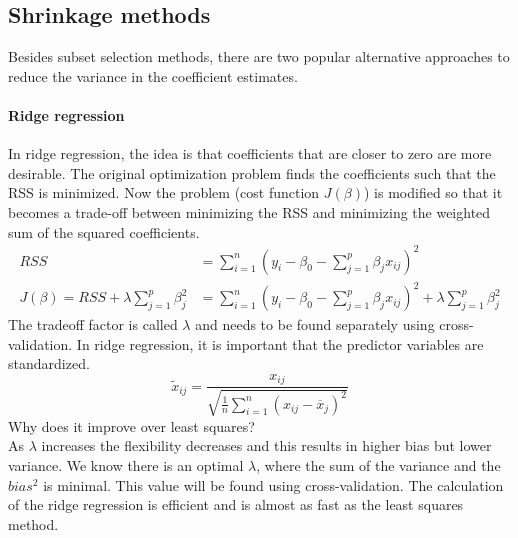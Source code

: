 \documentclass[../document.tex]{subfiles}
\begin{document}
	\subsection{Shrinkage methods}
	Besides subset selection methods, there are two popular alternative approaches to reduce the variance in the coefficient estimates.

	\paragraph{Ridge regression}
	In ridge regression, the idea is that coefficients that are closer to zero are more desirable. The original optimization problem finds the coefficients such that the RSS is minimized. Now the problem (cost function $J(\beta)$) is modified so that it becomes a trade-off between minimizing the RSS and minimizing the weighted sum of the squared coefficients.
	\begin{equation}
	\begin{split}
		RSS &= \sum_{i=1}^{n}(y_{i}-\beta_{0}-\sum_{j=1}^{p}\beta_{j}x_{ij})^2\\
		J(\beta) = RSS+\lambda\sum_{j=1}^{p}\beta_{j}^2 &= \sum_{i=1}^{n}(y_{i}-\beta_{0}-\sum_{j=1}^{p}\beta_{j}x_{ij})^2+\lambda\sum_{j=1}^{p}\beta_{j}^2
	\end{split}
	\end{equation}
	The tradeoff factor is called \(\lambda\) and needs to be found separately using cross-validation. In ridge regression, it is important that the predictor variables are standardized.
	\begin{equation}
		\tilde{x}_{ij}=\frac{x_{ij}}{\sqrt{\frac{1}{n}\sum_{i=1}^{n}(x_{ij}-\overline{x}_{j})^2}}
	\end{equation}
	Why does it improve over least squares?\\
	As \(\lambda\) increases the flexibility decreases and this results in higher bias but lower variance. We know there is an optimal \(\lambda\), where the sum of the variance and the \(bias^2\) is minimal. This value will be found using cross-validation. The calculation of the ridge regression is efficient and is almost as fast as the least squares method.
\end{document}
